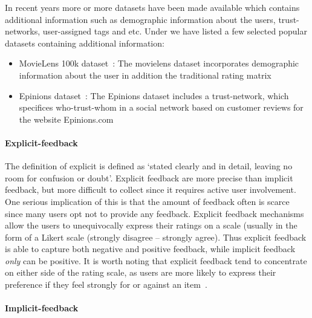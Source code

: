 In recent years more or more datasets have been made available which contains
additional information such as demographic information about the users,
trust-networks, user-assigned tags and etc. Under we have listed a few selected
popular datasets containing additional information:


\begin{itemize}

\item MovieLens 100k dataset~\cite{Movielens}: The movielens dataset
	incorporates demographic information about the user in addition the
	traditional rating matrix

\item Epinions dataset~\cite{Epinions}: The Epinions dataset includes a
	trust-network, which specifices who-trust-whom in a social network based on
	customer reviews for the website Epinions.com

\end{itemize}

\paragraph{Explicit-feedback}

The definition of explicit is defined as `stated clearly and in detail, leaving
no room for confusion or doubt'. Explicit feedback are more precise than
implicit feedback, but more difficult to collect since it requires active user
involvement. One serious implication of this is that the amount of feedback
often is scarce since many users opt not to provide any feedback. Explicit
feedback mechanisms allow the users to unequivocally express their ratings on a
scale (usually in the form of a Likert scale (strongly disagree – strongly
agree). Thus explicit feedback is able to capture both negative and positive
feedback, while implicit feedback \emph{only} can be positive. It is worth
noting that explicit feedback tend to concentrate on either side of the rating
scale, as users are more likely to express their preference if they feel
strongly for or against an item~\cite{Jawaheer2010}.

\paragraph{Implicit-feedback}


